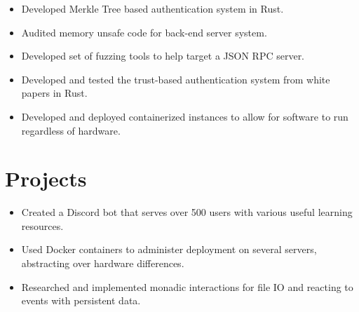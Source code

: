 \documentclass[
	9pt, %
]{FreemanCV}
\begin{document}
\begin{paracol}{2}
{	\begin{itemize}[noitemsep, topsep=0pt, partopsep=0pt, leftmargin=8pt]
	\item	Developed Merkle Tree based authentication system in Rust.
	\item	Audited memory unsafe code for back-end server system.
	\item	Developed set of fuzzing tools to help target a JSON RPC server.
	\item	Developed and tested the trust-based authentication system from white papers in Rust.
	\item	Developed and deployed containerized instances to allow for software to run regardless of hardware. 
\end{itemize}
	} %

\section{Projects}
{
	\begin{itemize}[noitemsep, topsep=0pt, partopsep=0pt, leftmargin=8pt, before =\leavevmode\vspace*{-\baselineskip}]
		\item Created a Discord bot that serves over 500 users with various useful learning resources.
		\item Used Docker containers to administer deployment on several servers, abstracting over hardware differences.
		\item Researched and implemented monadic interactions for file IO and reacting to events with persistent data.
	\end{itemize}
}




\end{paracol}
\end{document}
